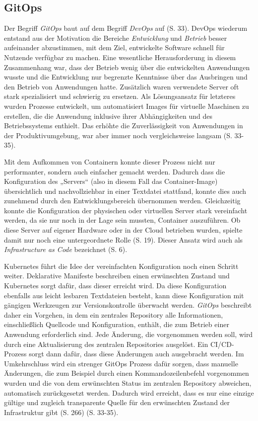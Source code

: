\documentclass[11pt,a4paper]{article}
\begin{document}
\subsection{GitOps}
Der Begriff \emph{GitOps} baut auf dem Begriff \emph{DevOps} auf \cite{cicd_with_kubernetes_devops} (S. 33).
DevOps wiederum entstand aus der Motivation die Bereiche \emph{Entwicklung} und \emph{Betrieb}
besser aufeinander abzustimmen, mit dem Ziel, entwickelte Software schnell
für Nutzende verfügbar zu machen. Eine wesentliche Herausforderung in diesem Zusammenhang
war, dass der Betrieb wenig über die entwickelten Anwendungen wusste und
die Entwicklung nur begrenzte Kenntnisse über das Ausbringen und den Betrieb von Anwendungen hatte.
Zusätzlich waren verwendete Server oft stark spezialisiert und schwierig zu ersetzen.
Als Lösungsansatz für letzteres wurden Prozesse entwickelt, um automatisiert Images
für virtuelle Maschinen zu erstellen, die die Anwendung inklusive ihrer Abhängigkeiten
und des Betriebssystems enthielt. Das erhöhte die Zuverlässigkeit von
Anwendungen in der Produktivumgebung, war aber immer noch vergleichsweise langsam \cite{cicd_with_kubernetes_devops} (S. 33-35).

Mit dem Aufkommen von Containern konnte dieser Prozess nicht nur performanter, sondern
auch einfacher gemacht werden. Dadurch dass die Konfiguration des „Servers“ (also in diesem
Fall das Container-Image) übersichtlich und nachvollziehbar in einer Textdatei stattfand,
konnte dies auch zunehmend durch den Entwicklungsbereich übernommen werden.
Gleichzeitig konnte die Konfiguration der physischen oder virtuellen Server
stark vereinfacht werden, da sie nur noch in der Lage sein mussten, Container auszuführen.
Ob diese Server auf eigener Hardware oder in der Cloud betrieben wurden, spielte damit nur
noch eine untergeordnete Rolle \cite{cicd_with_kubernetes_devops} (S. 19).
Dieser Ansatz wird auch als \emph{Infrastructure as Code} bezeichnet \cite{domingus2022cloud} (S. 6).

Kubernetes führt die Idee der vereinfachten Konfiguration noch einen Schritt weiter.
Deklarative Manifeste beschreiben einen erwünschten Zustand
und Kubernetes sorgt dafür, dass dieser erreicht wird.
Da diese Konfiguration ebenfalls aus leicht lesbaren Textdateien besteht,
kann diese Konfiguration mit gängigen Werkzeugen zur Versionskontrolle
überwacht werden. \emph{GitOps} beschreibt daher ein Vorgehen,
in dem ein zentrales Repository alle Informationen, einschließlich Quellcode und Konfiguration,
enthält, die zum Betrieb einer Anwendung erforderlich sind.
Jede Änderung, die vorgenommen werden soll, wird durch eine Aktualisierung
des zentralen Repositories ausgelöst. Ein CI/CD-Prozess sorgt dann dafür,
dass diese Änderungen auch ausgebracht werden.
Im Umkehrschluss wird ein strenger GitOps Prozess dafür sorgen,
dass manuelle Änderungen, die zum Beispiel durch einen Kommandozeilenbefehl
vorgenommen wurden und die von dem erwünschten Status im zentralen Repository
abweichen, automatisch zurückgesetzt werden.
Dadurch wird erreicht, dass es nur eine einzige gültige und zugleich transparente
Quelle für den erwünschten Zustand der Infrastruktur gibt \cite{domingus2022cloud} (S. 266) \cite{cicd_with_kubernetes_devops} (S. 33-35).
\end{document}
